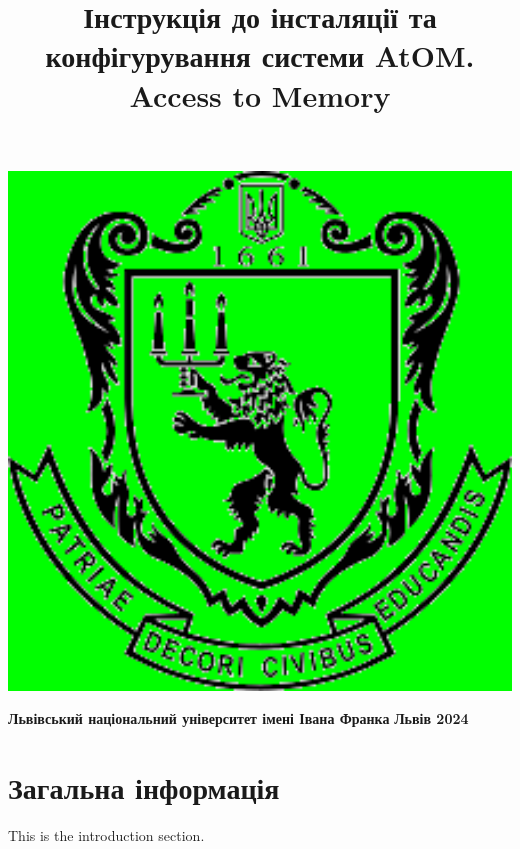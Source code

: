 \documentclass[14pt,a4paper]{article}
\title{\Huge \textbf{Інструкція до інсталяції та конфігурування системи AtOM. Access to Memory} }
\date{}
\begin{document}
\begin{titlepage}
    \pagecolor{green} 
    \color{black}
    \maketitle
    \thispagestyle{empty}
    
	\begin{center}
	\includegraphics[max width=1.5\textwidth]{Images/logo_grn.png}
	\end{center}    
    
    \vspace*{8cm}
    \center \textbf{Львівський національний університет імені Івана Франка}
    \center \textbf{Львів 2024}

\end{titlepage}

\pagecolor{white}
\color{black}

\newpage

\tableofcontents
\newpage
\listoffigures
\newpage
\listoftables
\newpage
{}

\section{Загальна інформація}
This is the introduction section.
\end{document}
